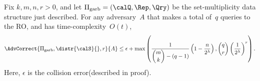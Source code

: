 \begin{theorem}\label{thm:gbf-correctness}
Fix $k,m,n,r>0$, and let $\Pi_{\mathrm{garb}}= (\calQ,\Rep, \Qry)$ be the set-multiplicity data structure just described. For any adversary~$A$ that makes a total of~$q$ queries to the RO, and has time-complexity~$O(t)$,
\[
\AdvCorrect{\Pi_{\mathrm{garb}},\distr{\calS}{},r}{A} \leq  \epsilon +  \max\left(\dfrac{1}{\dbinom{m}{k}-(q-1)}\left(1-\dfrac{n}{2^\lambda}\right), \dbinom{q}{r}\left(\dfrac{1}{2^\lambda}\right)^r \right).
\]
Here, $\epsilon$ is the collision error(described in proof).
\end{theorem}
